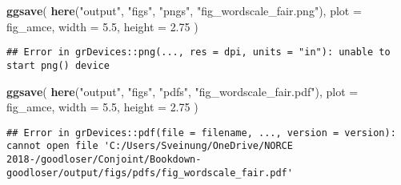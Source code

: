 \documentclass[]{book}
\newenvironment{Shaded}{\begin{snugshade}}{\end{snugshade}}
\newcommand{\KeywordTok}[1]{\textcolor[rgb]{0.13,0.29,0.53}{\textbf{#1}}}
\newcommand{\DataTypeTok}[1]{\textcolor[rgb]{0.13,0.29,0.53}{#1}}
\newcommand{\FloatTok}[1]{\textcolor[rgb]{0.00,0.00,0.81}{#1}}
\newcommand{\StringTok}[1]{\textcolor[rgb]{0.31,0.60,0.02}{#1}}
\newcommand{\NormalTok}[1]{#1}
\begin{document}
\begin{Shaded}
\begin{Highlighting}[]
\KeywordTok{ggsave}\NormalTok{(}
  \KeywordTok{here}\NormalTok{(}\StringTok{"output"}\NormalTok{, }\StringTok{"figs"}\NormalTok{, }\StringTok{"pngs"}\NormalTok{, }\StringTok{"fig_wordscale_fair.png"}\NormalTok{),}
  \DataTypeTok{plot =}\NormalTok{ fig_amce,}
  \DataTypeTok{width =} \FloatTok{5.5}\NormalTok{, }\DataTypeTok{height =} \FloatTok{2.75}
\NormalTok{)}
\end{Highlighting}
\end{Shaded}

\begin{verbatim}
## Error in grDevices::png(..., res = dpi, units = "in"): unable to start png() device
\end{verbatim}

\begin{Shaded}
\begin{Highlighting}[]
\KeywordTok{ggsave}\NormalTok{(}
  \KeywordTok{here}\NormalTok{(}\StringTok{"output"}\NormalTok{, }\StringTok{"figs"}\NormalTok{, }\StringTok{"pdfs"}\NormalTok{, }\StringTok{"fig_wordscale_fair.pdf"}\NormalTok{),}
  \DataTypeTok{plot =}\NormalTok{ fig_amce,}
  \DataTypeTok{width =} \FloatTok{5.5}\NormalTok{, }\DataTypeTok{height =} \FloatTok{2.75}
\NormalTok{)}
\end{Highlighting}
\end{Shaded}

\begin{verbatim}
## Error in grDevices::pdf(file = filename, ..., version = version): cannot open file 'C:/Users/Sveinung/OneDrive/NORCE 2018-/goodloser/Conjoint/Bookdown-goodloser/output/figs/pdfs/fig_wordscale_fair.pdf'
\end{verbatim}
\end{document}
